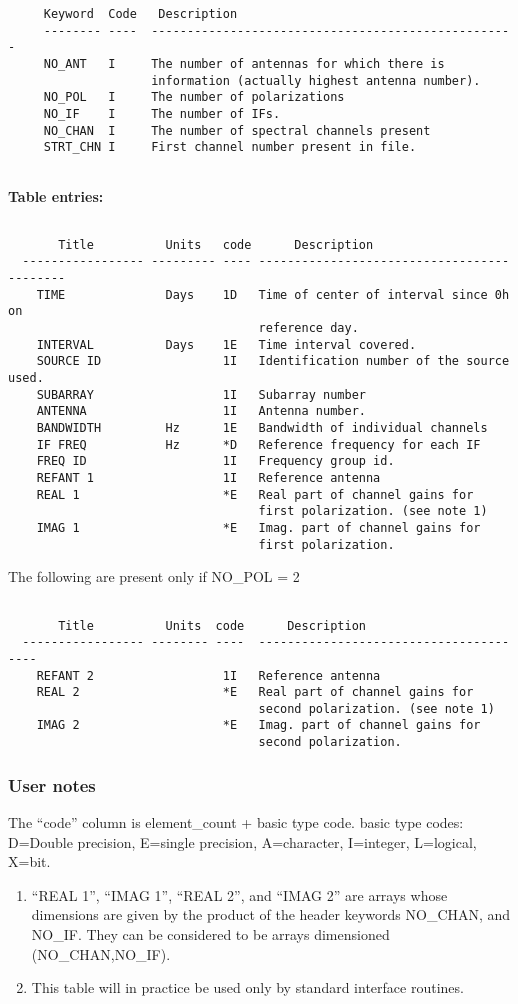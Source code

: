 \begin{verbatim}
     Keyword  Code   Description
     -------- ----  ---------------------------------------------------
     NO_ANT   I     The number of antennas for which there is
                    information (actually highest antenna number).
     NO_POL   I     The number of polarizations
     NO_IF    I     The number of IFs.
     NO_CHAN  I     The number of spectral channels present
     STRT_CHN I     First channel number present in file.
 
\end{verbatim}
{\bf Table entries:}
\begin{verbatim}

       Title          Units   code      Description
  ----------------- --------- ---- -------------------------------------------
    TIME              Days    1D   Time of center of interval since 0h on
                                   reference day.
    INTERVAL          Days    1E   Time interval covered.
    SOURCE ID                 1I   Identification number of the source used.
    SUBARRAY                  1I   Subarray number
    ANTENNA                   1I   Antenna number.
    BANDWIDTH         Hz      1E   Bandwidth of individual channels
    IF FREQ           Hz      *D   Reference frequency for each IF
    FREQ ID                   1I   Frequency group id.
    REFANT 1                  1I   Reference antenna
    REAL 1                    *E   Real part of channel gains for
                                   first polarization. (see note 1)
    IMAG 1                    *E   Imag. part of channel gains for
                                   first polarization.

\end{verbatim}
The following are present only if NO\_POL = 2
\begin{verbatim}

       Title          Units  code      Description
  ----------------- -------- ----  ---------------------------------------
    REFANT 2                  1I   Reference antenna
    REAL 2                    *E   Real part of channel gains for
                                   second polarization. (see note 1)
    IMAG 2                    *E   Imag. part of channel gains for
                                   second polarization.
\end{verbatim}


\subsubsection{User notes}
  The ``code'' column is element\_count + basic type code.
basic type codes: D=Double precision, E=single precision, A=character,
I=integer, L=logical, X=bit.
\begin{enumerate}
\item  ``REAL 1'', ``IMAG 1'', ``REAL 2'', and ``IMAG 2''
are arrays whose dimensions are given by the product of the  header
keywords NO\_CHAN, and NO\_IF.  They can be considered to be arrays
dimensioned (NO\_CHAN,NO\_IF).
\item This table will in practice be used only by standard interface
routines.
\end{enumerate}

